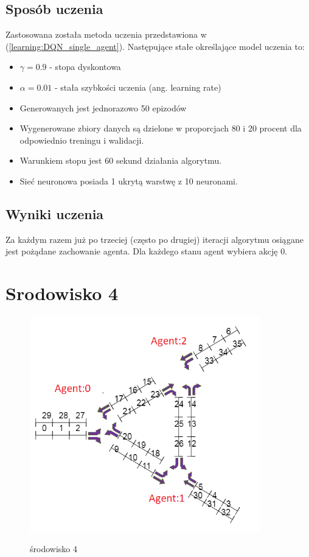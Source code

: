 \documentclass[12pt]{book}
\theoremstyle{plain}
\newcommand{\myref}[1]{(\ref{#1})}
\begin{document}
\subsection{Sposób uczenia}
Zastosowana została metoda uczenia przedstawiona w \myref{learning:DQN_single_agent}. Następujące stałe określające model uczenia to:
\begin{itemize}
	\item $\gamma = 0.9$ - stopa dyskontowa
	\item $\alpha = 0.01$ - stała szybkości uczenia (ang. learning rate)
	\item Generowanych jest jednorazowo 50 epizodów
	\item Wygenerowane zbiory danych są dzielone w proporcjach 80 i 20 procent dla odpowiednio treningu i walidacji.
	\item Warunkiem stopu jest 60 sekund działania algorytmu.
	\item Sieć neuronowa posiada 1 ukrytą warstwę z 10 neuronami.
\end{itemize}

\subsection{Wyniki uczenia}
Za każdym razem już po trzeciej (często po drugiej) iteracji algorytmu osiągane jest pożądane zachowanie agenta. Dla każdego stanu agent wybiera akcję 0.


\section{Srodowisko 4}
\begin{figure}[H]
	\centering
	\includegraphics[width=10cm]{env_4_agenci}
	\label{fig:env_4_agenci}
	\caption{środowisko 4}
\end{figure}
\end{document}

